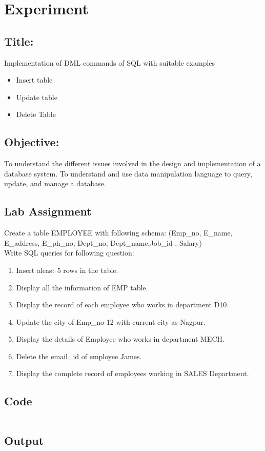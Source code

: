 \documentclass{article}
\begin{document}
\section*{Experiment \jobname}
\subsection*{\textbf{Title:}} Implementation of DML commands of SQL with suitable examples
\begin{itemize}
	\item Insert table
	\item Update table
	\item Delete Table
\end{itemize}
\subsection*{\textbf{Objective:}} To understand the different issues involved in the design and implementation of a database system.
To understand and use data manipulation language to query, update, and manage a
database.
\subsection*{Lab Assignment}
Create a table EMPLOYEE with following schema: (Emp_no, E_name, E_address, E_ph_no, Dept_no, Dept_name,Job_id , Salary)\\
Write SQL queries for following question:
\begin{enumerate}
	\item Insert aleast 5 rows in the table.
	\item Display all the information of EMP table.
	\item Display the record of each employee who works in department D10.
	\item Update the city of Emp_no-12 with current city as Nagpur.
	\item Display the details of Employee who works in department MECH.
	\item Delete the email_id of employee James.
	\item Display the complete record of employees working in SALES Department.
\end{enumerate}
\subsection*{Code}
\inputminted{sql}{code/\jobname.sql}
\subsection*{Output}

\end{document}

